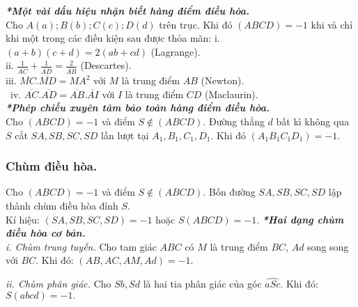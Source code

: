 \documentclass[12pt,a4paper]{article}
\begin{document}
\textbf{\textit{*Một vài dấu hiệu nhận biết hàng điểm điều hòa.}}\\
Cho \(A\left( a \right);B\left( b \right);C\left( c \right);D\left( d \right)\) trên trục. Khi đó \(\left( {ABCD} \right) =  - 1\) khi và chỉ khi một trong các điều kiện sau được thỏa mãn:
i. \(\left( {a + b} \right)\left( {c + d} \right) = 2\left( {ab + cd} \right)\) (Lagrange).\\
ii. \(\frac{1}{{\overline {AC} }} + \frac{1}{{\overline {AD} }} = \frac{2}{{\overline {AB} }}\) (Descartes).\\
iii. \(\overline {MC} .\overline {MD}  = M{A^2}\) với \(M\) là trung điểm \(AB\) (Newton).\\\
iv. \(\overline {AC} .\overline {AD}  = \overline {AB} .\overline {AI} \) với \(I\) là trung điểm \(CD\) (Maclaurin).\\
\textbf{\textit{*Phép chiếu xuyên tâm bảo toàn hàng điểm điều hòa.}}\\
Cho \(\left( {ABCD} \right) =  - 1\) và điểm \(S \notin \left( {ABCD} \right).\) Đường thẳng \(d\) bất kì không qua \(S\) cắt \(SA, SB, SC, SD\) lần lượt tại \(A_1, B_1, C_1, D_1\). Khi đó \(\left( {{A_1}{B_1}{C_1}{D_1}} \right) =  - 1.\)
\subsubsection{Chùm điều hòa.}
Cho \(\left( {ABCD} \right) =  - 1\) và điểm \(S \notin \left( {ABCD} \right).\) Bốn đường \(SA, SB, SC, SD\) lập thành chùm điều hòa đỉnh \(S\). \\
Kí hiệu: \(\left( {SA,SB,SC,SD} \right) =  - 1\) hoặc \(S\left( {ABCD} \right) =  - 1.\)
\textbf{\textit{*Hai dạng chùm điều hòa cơ bản.}}\\
\textit{i. Chùm trung tuyến.} Cho tam giác \(ABC\) có \(M\) là trung điểm \(BC\), \(Ad\) song song với \(BC\). Khi đó: \(\left( {AB,AC,AM,Ad} \right) =  - 1.\)
\begin{center}
\end{center}
\textit{ii. Chùm phân giác.} Cho \(Sb, Sd\) là hai tia phân giác của góc \(\widehat {aSc}\). Khi đó: \(S\left( {abcd} \right) =  - 1.\)
\begin{center}
\end{center}
\end{document}
